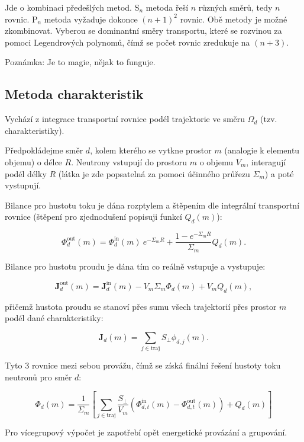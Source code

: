 Jde o kombinaci předešlých metod. S$_n$ metoda řeší $n$ různých směrů, tedy $n$ rovnic. P$_n$ metoda vyžaduje dokonce $(n+1)^2$ rovnic. Obě metody je možné zkombinovat. Vyberou se dominantní směry transportu, které se rozvinou za pomoci Legendrových polynomů, čímž se počet rovnic zredukuje na $(n+3)$.

Poznámka: Je to magie, nějak to funguje. 

\subsection{Metoda charakteristik}

Vychází z integrace transportní rovnice podél trajektorie ve směru $\Omega_d$ (tzv. charakteristiky). 

Předpokládejme směr $d$, kolem kterého se vytkne prostor $m$ (analogie k elementu objemu) o délce $R$. Neutrony vstupují do prostoru $m$ o objemu $V_m$, interagují podél délky $R$ (látka je zde popsatelná za pomoci účinného průřezu $\Sigma_m$) a poté vystupují. 

Bilance pro hustotu toku je dána rozptylem a štěpením dle integrální transportní rovnice (štěpení pro zjednodušení popisuji funkcí $Q_d(m)$):

$$ \Phi_d^\text{out}(m) = \Phi_d^\text{in}(m) \: e^{-\Sigma_m R} + \dfrac{1 - e^{-\Sigma_m R}}{\Sigma_m} Q_d(m). $$

Bilance pro hustotu proudu je dána tím co reálně vstupuje a vystupuje:

$$ \textbf{J}_d^\text{out}(m) = \textbf{J}_d^\text{in}(m) - V_m \Sigma_m \Phi_d(m) + V_m Q_d(m), $$

přičemž hustota proudu se stanoví přes sumu všech trajektorií přes prostor $m$ podél dané charakteristiky:

$$ \textbf{J}_d (m) = \sum_{j \in \text{traj}} S_\perp \phi_{d,j}(m). $$

Tyto 3 rovnice mezi sebou provážu, čímž se získá finální řešení hustoty toku neutronů pro směr $d$:

$$ \Phi_d(m) = \dfrac{1}{\Sigma_m} \left[ \sum_{j \in \text{traj}} \dfrac{S_\perp}{V_m} \left( \Phi_{d,t}^\text{in}(m) - \Phi_{d,t}^\text{out}(m) \right) + Q_d(m) \right] $$

Pro vícegrupový výpočet je zapotřebí opět energetické provázání a grupování.